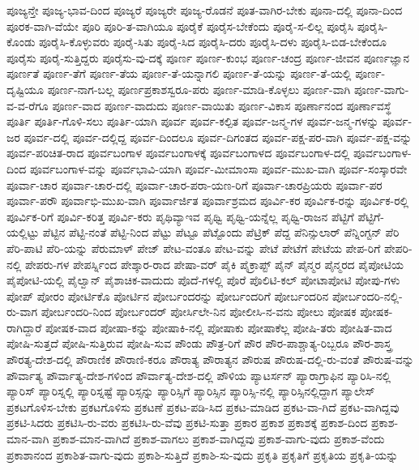 {ಪೂಜ್ಯನ್ತೇ
ಪೂಜ್ಯ-ಭಾವ-ದಿಂದ
ಪೂಜ್ಯರೆ
ಪೂಜ್ಯರೇ
ಪೂಜ್ಯ-ರೊಡನೆ
ಪೂತ-ವಾಗಿರ-ಬೇಕು
ಪೂನಾ-ದಲ್ಲಿ
ಪೂನಾ-ದಿಂದ
ಪೂರಕ-ವಾಗಿ-ವೆಯೇ
ಪೂರಿ
ಪೂರಿ-ತ-ವಾಗಿಯೂ
ಪೂರೈಕೆ
ಪೂರೈಸ-ಬೇಕೆಂದು
ಪೂರೈ-ಸ-ಲಿಲ್ಲ
ಪೂರೈಸಿ
ಪೂರೈಸಿ-ಕೊಂಡು
ಪೂರೈಸಿ-ಕೊಳ್ಳುವರು
ಪೂರೈ-ಸಿತು
ಪೂರೈ-ಸಿದ
ಪೂರೈಸಿ-ದರು
ಪೂರೈಸಿ-ದಳು
ಪೂರೈಸಿ-ಬಿಡ-ಬೇಕೆಂದೂ
ಪೂರೈಸು
ಪೂರೈ-ಸುತ್ತಿದ್ದರು
ಪೂರೈಸು-ವು-ದಕ್ಕೆ
ಪೂರ್ಣ
ಪೂರ್ಣ-ಕುಂಭ
ಪೂರ್ಣ-ಚಂದ್ರ
ಪೂರ್ಣ-ಜೀವನ
ಪೂರ್ಣಜ್ಞಾನ
ಪೂರ್ಣತೆ
ಪೂರ್ಣ-ತೆಗೆ
ಪೂರ್ಣ-ತೆಯ
ಪೂರ್ಣ-ತೆ-ಯನ್ನಾಗಲಿ
ಪೂರ್ಣ-ತೆ-ಯನ್ನು
ಪೂರ್ಣ-ತೆ-ಯಲ್ಲಿ
ಪೂರ್ಣ-ದೃಷ್ಟಿಯೂ
ಪೂರ್ಣ-ನಾಗ-ಬಲ್ಲ
ಪೂರ್ಣಪ್ರಕಾಶಸ್ವರೂ-ಪರು
ಪೂರ್ಣ-ಮಾಡಿ-ಕೊಳ್ಳಲು
ಪೂರ್ಣ-ವಾಗಿ
ಪೂರ್ಣ-ವಾಗು-ವ-ವ-ರೆಗೂ
ಪೂರ್ಣ-ವಾದ
ಪೂರ್ಣ-ವಾದುದು
ಪೂರ್ಣ-ವಾಯಿತು
ಪೂರ್ಣ-ವಿಕಾಸ
ಪೂರ್ಣಾನಂದ
ಪೂರ್ಣಾವಸ್ಥೆ
ಪೂರ್ತಿ
ಪೂರ್ತಿ-ಗೊಳಿ-ಸಲು
ಪೂರ್ತಿ-ಯಾಗಿ
ಪೂರ್ವ
ಪೂರ್ವ-ಕಲ್ಪಿತ
ಪೂರ್ವ-ಜನ್ಮ-ಗಳ
ಪೂರ್ವ-ಜನ್ಮ-ಗಳನ್ನು
ಪೂರ್ವ-ಜರ
ಪೂರ್ವ-ದಲ್ಲಿ
ಪೂರ್ವ-ದಲ್ಲಿದ್ದ
ಪೂರ್ವ-ದಿಂದಲೂ
ಪೂರ್ವ-ದಿಗಂತದ
ಪೂರ್ವ-ಪಕ್ಷ-ಪರ-ವಾಗಿ
ಪೂರ್ವ-ಪಕ್ಷ-ವನ್ನು
ಪೂರ್ವ-ಪರಿಚಿತ-ರಾದ
ಪೂರ್ವಬಂಗಾಳ
ಪೂರ್ವಬಂಗಾಳಕ್ಕೆ
ಪೂರ್ವಬಂಗಾಳದ
ಪೂರ್ವಬಂಗಾಳ-ದಲ್ಲಿ
ಪೂರ್ವಬಂಗಾಳ-ದಿಂದ
ಪೂರ್ವಬಂಗಾಳ-ವನ್ನು
ಪೂರ್ವಭಾವಿ-ಯಾಗಿ
ಪೂರ್ವ-ಮೀಮಾಂಸಾ
ಪೂರ್ವ-ಮುಖ-ವಾಗಿ
ಪೂರ್ವ-ಸಂಸ್ಕಾರವೇ
ಪೂರ್ವಾ-ಚಾರ
ಪೂರ್ವಾ-ಚಾರ-ದಲ್ಲಿ
ಪೂರ್ವಾ-ಚಾರ-ಪರಾ-ಯಣ-ರಿಗೆ
ಪೂರ್ವಾ-ಚಾರಪ್ರಿಯರು
ಪೂರ್ವಾ-ಪರ
ಪೂರ್ವಾ-ಪರೌ
ಪೂರ್ವಾಭಿ-ಮುಖ-ವಾಗಿ
ಪೂರ್ವಾರ್ಜಿತ
ಪೂರ್ವಾಶ್ರಮದ
ಪೂರ್ವಿ-ಕರ
ಪೂರ್ವಿಕ-ರನ್ನು
ಪೂರ್ವಿಕ-ರಲ್ಲಿ
ಪೂರ್ವಿಕ-ರಿಗೆ
ಪೂರ್ವಿ-ಕರಿತ್ತ
ಪೂರ್ವಿ-ಕರು
ಪೃಥಿವ್ಯಾಇವ
ಪೃಥ್ವಿ
ಪೃಥ್ವಿ-ಯನ್ನೆಲ್ಲ
ಪೃಥ್ವಿ-ರಾಜನ
ಪೆಟ್ಟಿಗೆ
ಪೆಟ್ಟಿಗೆ-ಯಲ್ಲಿಟ್ಟು
ಪೆಟ್ಟಿನ
ಪೆಟ್ಟಿ-ನಂತೆ
ಪೆಟ್ಟಿ-ನಿಂದ
ಪೆಟ್ಟು
ಪೆಟ್ಟೂ
ಪೆಟ್ಟೊಂದು
ಪೆಟ್ರಿಕ್
ಪೆದ್ದ
ಪೆನಿನ್ಸುಲಾರ್
ಪೆನ್ನಿಂಗ್ಟನ್
ಪೆರಿ
ಪೆರಿ-ಪಾಟಿ
ಪೆರಿ-ಯನ್ನು
ಪೆರುಮಾಳ್
ಪೇಜ್
ಪೇಟ-ವಂತೂ
ಪೇಟ-ವನ್ನು
ಪೇಟೆ
ಪೇಟೆಗೆ
ಪೇಟೆಯ
ಪೇಪ-ರಿಗೆ
ಪೇಪರಿ-ನಲ್ಲಿ
ಪೇಪರು-ಗಳ
ಪೇಪರ್ಸ್ನಿಂದ
ಪೇಶ್ಕಾರ-ರಾದ
ಪೇಷಾ-ವರ್
ಪೈಕಿ
ಪೈಕ್ರಾಪ್ಟ್
ಪೈನ್
ಪೈನ್ಮರ
ಪೈನ್ಮರದ
ಪೈಪೋಟಿಯ
ಪೈಪೋಟಿ-ಯಲ್ಲಿ
ಪೈಲ್ವಾನ್
ಪೈಶಾಚಿಕ-ವಾದುದು
ಪೊದೆ-ಗಳಲ್ಲಿ
ಪೊರೆ
ಪೊಲಿಟಿ-ಕಲ್
ಪೋಟಾಪೋಟಿ
ಪೋಪು-ಗಳು
ಪೋಪ್
ಪೋರಂ
ಪೋರ್ಟಿಕೊ
ಪೋರ್ಟಿನ
ಪೋರ್ಬಂದರನ್ನು
ಪೋರ್ಬಂದರಿಗೆ
ಪೋರ್ಬಂದರಿನ
ಪೋರ್ಬಂದರಿ-ನಲ್ಲಿ-ರು-ವಾಗ
ಪೋರ್ಬಂದರಿ-ನಿಂದ
ಪೋರ್ಬಂದರ್
ಪೋರ್ಸಿಲೇ-ನಿನ
ಪೋಲೀಸಿ-ನ-ವನು
ಪೋಲು
ಪೋಷಕ
ಪೋಷಕ-ರಾಗಿದ್ದಾರೆ
ಪೋಷಕ-ವಾದ
ಪೋಷಾ-ಕನ್ನು
ಪೋಷಾಕಿ-ನಲ್ಲಿ
ಪೋಷಾಕು
ಪೋಷಾಕೆಲ್ಲ
ಪೋಷಿ-ತರು
ಪೋಷಿತ-ವಾದ
ಪೋಷಿ-ಸುತ್ತದೆ
ಪೋಷಿ-ಸುತ್ತಿರುವ
ಪೋಷಿ-ಸುವ
ಪೌಂಡು
ಪೌತ್ರ-ರಿಗೆ
ಪೌರ
ಪೌರ-ಪಾಶ್ಚಾತ್ಯ-ರಿಬ್ಬರೂ
ಪೌರ-ಶಾಸ್ತ್ರ
ಪೌರತ್ಯ-ದೇಶ-ದಲ್ಲಿ
ಪೌರಾಣಿಕ
ಪೌರಾಣಿ-ಕರೂ
ಪೌರಾತ್ಯ
ಪೌರಾತ್ಯನ
ಪೌರುಷ
ಪೌರುಷ-ದಲ್ಲಿ-ರು-ವಂತೆ
ಪೌರುಷ-ವನ್ನು
ಪೌರ್ವಾತ್ಯ
ಪೌರ್ವಾತ್ಯ-ದೇಶ-ಗಳಿಂದ
ಪೌರ್ವಾತ್ಯ-ದೇಶ-ದಲ್ಲಿ
ಪೌಳಿಯ
ಪ್ಯಾಟರ್ಸನ್
ಪ್ಯಾರಾಗ್ರಾಫಿನ
ಪ್ಯಾರಿಸಿ-ನಲ್ಲಿ
ಪ್ಯಾರಿಸ್
ಪ್ಯಾರಿಸ್ನಲ್ಲಿ
ಪ್ಯಾರಿಸ್ನಷ್ಟೆ
ಪ್ಯಾರಿಸ್ಸನ್ನು
ಪ್ಯಾರಿಸ್ಸಿಗೆ
ಪ್ಯಾರಿಸ್ಸಿನ
ಪ್ಯಾರಿಸ್ಸಿ-ನಲ್ಲಿ
ಪ್ಯಾರಿಸ್ಸಿನಲ್ಲಿದ್ದಾಗ
ಪ್ಯಾಲೇಸ್
ಪ್ರಕಟಗೊಳಿಸ-ಬೇಕು
ಪ್ರಕಟಗೊಳಿಸು
ಪ್ರಕಟಣೆ
ಪ್ರಕಟ-ಪಡಿ-ಸಿದ
ಪ್ರಕಟ-ಮಾಡಿದ
ಪ್ರಕಟ-ವಾ-ಗಿದೆ
ಪ್ರಕಟ-ವಾಗಿದ್ದವು
ಪ್ರಕಟಿ-ಸಿದರು
ಪ್ರಕಟಿಸಿ-ರು-ವರು
ಪ್ರಕಟಿಸಿ-ರು-ವೆವು
ಪ್ರಕಟಿ-ಸುತ್ತಾ
ಪ್ರಕಾರ
ಪ್ರಕಾಶ
ಪ್ರಕಾಶಕ್ಕೆ
ಪ್ರಕಾಶ-ದಿಂದ
ಪ್ರಕಾಶ-ಮಾನ-ವಾಗಿ
ಪ್ರಕಾಶ-ಮಾನ-ವಾಗಿದೆ
ಪ್ರಕಾಶ-ವಾಗಲು
ಪ್ರಕಾಶ-ವಾಗಿದ್ದವು
ಪ್ರಕಾಶ-ವಾಗು-ವುದು
ಪ್ರಕಾಶ-ವೆಂದು
ಪ್ರಕಾಶಾನಂದ
ಪ್ರಕಾಶಿತ-ವಾಗು-ವುದು
ಪ್ರಕಾಶಿ-ಸುತ್ತಿದೆ
ಪ್ರಕಾಶಿ-ಸು-ವುದು
ಪ್ರಕೃತಿ
ಪ್ರಕೃತಿಗೆ
ಪ್ರಕೃತಿಯ
ಪ್ರಕೃತಿ-ಯನ್ನು
}
